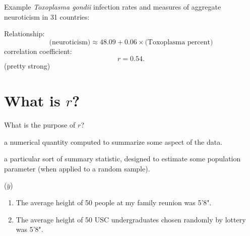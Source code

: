\begin{frame}{Example}
  \textit{Toxoplasma gondii} infection rates and measures of aggregate neuroticism in 31 countries:

    Relationship:
    \[ \text{(neuroticism)} \approx 48.09 + 0.06 \times \text{(Toxoplasma percent)} \]
    correlation coefficient:
    \[ r = 0.54 .  \]
    (pretty strong)

\end{frame}

\section{What is $r$?}

\begin{frame}{What is the purpose of $r$?}

   a numerical quantity computed to summarize some aspect of the data.

    \vspace{1em}

   a particular sort of summary statistic, designed to estimate some population parameter (when applied to a random sample).

    \vspace{2em}

   ($\bar y$)
  \begin{enumerate}
    \item The average height of 50 people at my family reunion was 5'8".
    \item The average height of 50 USC undergraduates chosen randomly by lottery was 5'8".
  \end{enumerate}

\end{frame}

